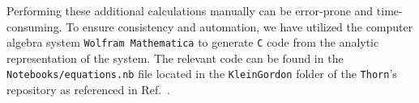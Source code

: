 Performing these additional calculations manually can be error-prone and time-consuming. To ensure consistency and automation, we have utilized the computer algebra system \texttt{Wolfram Mathematica} to generate \texttt{C} code from the analytic representation of the system. The relevant code can be found in the \texttt{Notebooks/equations.nb} file located in the \texttt{KleinGordon} folder of the \texttt{Thorn}'s repository as referenced in Ref.~\cite{FieldPerturbationsRepo}.